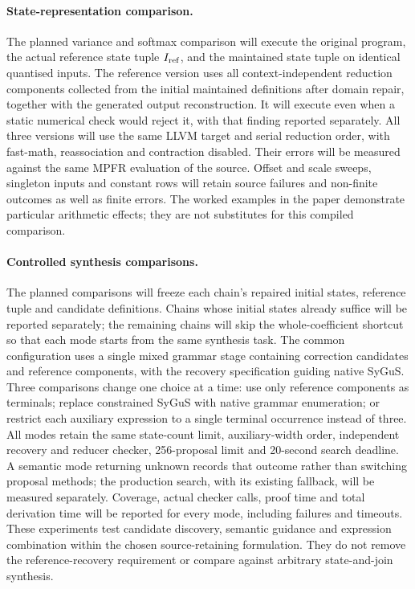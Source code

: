 \documentclass[acmsmall,screen,review,anonymous,nonacm]{acmart}
\begin{document}
\paragraph{State-representation comparison.}
The planned variance and softmax comparison will execute the original program, the actual reference state tuple $I_{\mathrm{ref}}$, and the maintained state tuple on identical quantised inputs.
The reference version uses all context-independent reduction components collected from the initial maintained definitions after domain repair, together with the generated output reconstruction.
It will execute even when a static numerical check would reject it, with that finding reported separately.
All three versions will use the same LLVM target and serial reduction order, with fast-math, reassociation and contraction disabled.
Their errors will be measured against the same MPFR evaluation of the source.
Offset and scale sweeps, singleton inputs and constant rows will retain source failures and non-finite outcomes as well as finite errors.
The worked examples in the paper demonstrate particular arithmetic effects; they are not substitutes for this compiled comparison.

\paragraph{Controlled synthesis comparisons.}
The planned comparisons will freeze each chain's repaired initial states, reference tuple and candidate definitions.
Chains whose initial states already suffice will be reported separately; the remaining chains will skip the whole-coefficient shortcut so that each mode starts from the same synthesis task.
The common configuration uses a single mixed grammar stage containing correction candidates and reference components, with the recovery specification guiding native SyGuS.
Three comparisons change one choice at a time: use only reference components as terminals; replace constrained SyGuS with native grammar enumeration; or restrict each auxiliary expression to a single terminal occurrence instead of three.
All modes retain the same state-count limit, auxiliary-width order, independent recovery and reducer checker, 256-proposal limit and 20-second search deadline.
A semantic mode returning unknown records that outcome rather than switching proposal methods; the production search, with its existing fallback, will be measured separately.
Coverage, actual checker calls, proof time and total derivation time will be reported for every mode, including failures and timeouts.
These experiments test candidate discovery, semantic guidance and expression combination within the chosen source-retaining formulation.
They do not remove the reference-recovery requirement or compare against arbitrary state-and-join synthesis.
\end{document}
